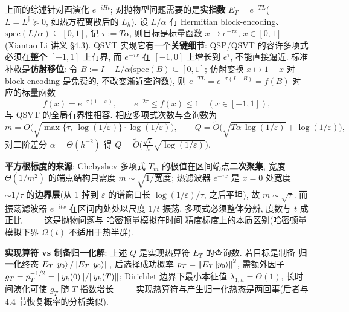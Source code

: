 \documentclass[utf8]{article} %
\numberwithin{equation}{section}   %
\newtheorem{Note}{\hskip 2em {\color{red} 注}}[subsection]
\begin{document}
\begin{Note}
    上面的综述针对酉演化 $e^{-iHt}$; 对抛物型问题需要的是\textbf{实指数}
    $E_T = e^{-TL}$($L = L^\dagger \succeq 0$, 如热方程离散后的 $L_h$). 设 $L/\alpha$ 有
    Hermitian block-encoding、$\mathrm{spec}(L/\alpha)\subseteq[0,1]$, 记 $\tau := T\alpha$,
    则目标是标量函数 $x \mapsto e^{-\tau x}$, $x \in [0,1]$(Xiantao Li 讲义 §4.3).
    QSVT 实现它有一个\textbf{关键细节}: QSP/QSVT 的容许多项式必须在\textbf{整个} $[-1,1]$ 上有界,
    而 $e^{-\tau x}$ 在 $[-1,0]$ 上增长到 $e^\tau$, 不能直接逼近. 标准补救是\textbf{仿射移位}:
    令 $B := I - L/\alpha$($\mathrm{spec}(B)\subseteq[0,1]$; 仿射变换 $x\mapsto 1-x$ 对
    block-encoding 是免费的, 不改变渐近查询数), 则
    $e^{-TL} = e^{-\tau(I-B)} = f(B)$ 对应的标量函数
    \begin{equation}
        f(x) = e^{-\tau(1-x)}, \qquad e^{-2\tau} \le f(x) \le 1 \quad (x \in [-1,1]),
    \end{equation}
    与 QSVT 的全局有界性相容. 相应多项式次数与查询数为
    \begin{equation}
        m = O\Big(\sqrt{\max\{\tau,\ \log(1/\varepsilon)\}\cdot\log(1/\varepsilon)}\Big),
        \qquad
        Q = \widetilde O\Big(\sqrt{T\alpha\,\log(1/\varepsilon)} + \log(1/\varepsilon)\Big),
    \end{equation}
    对二阶差分 $\alpha = \Theta(h^{-2})$ 得 $Q = \widetilde O\big(\frac{\sqrt T}{h}\sqrt{\log(1/\varepsilon)}\big)$.

    \textbf{平方根标度的来源}: Chebyshev 多项式 $T_m$ 的极值在区间端点\textbf{二次聚集}, 宽度
    $\Theta(1/m^2)$ 的端点结构只需度 $m \sim \sqrt{1/\text{宽度}}$; 热滤波器 $e^{-\tau x}$ 是
    $x=0$ 处宽度 $\sim 1/\tau$ 的\textbf{边界层}(从 1 掉到 $\varepsilon$ 的谱窗口长
    $\log(1/\varepsilon)/\tau$, 之后平坦), 故 $m \sim \sqrt{\tau}$. 而振荡滤波器 $e^{-itx}$
    在区间内处处以尺度 $1/t$ 振荡, 多项式必须整体分辨, 度数与 $t$ 成正比 —— 这是抛物问题与
    哈密顿量模拟在时间-精度标度上的本质区别(哈密顿量模拟下界 $\Omega(t)$ 不适用于热半群).

    \textbf{实现算符 vs 制备归一化解}: 上述 $Q$ 是实现热算符 $E_T$ 的查询数. 若目标是制备
    \textbf{归一化}终态 $E_T\ket{y_0}/\norm{E_T\ket{y_0}}$, 后选择成功概率
    $p_T = \norm{E_T\ket{y_0}}^2$, 需额外因子 $g_T = p_T^{-1/2} = \norm{y_h(0)}/\norm{y_h(T)}$;
    Dirichlet 边界下最小本征值 $\lambda_{1,h} = \Theta(1)$, 长时间演化可使 $g_T$ 随 $T$ 指数增长 ——
    实现热算符与产生归一化热态是两回事(后者与 4.4 节恢复概率的分析类似).
\end{Note}
\end{document}
